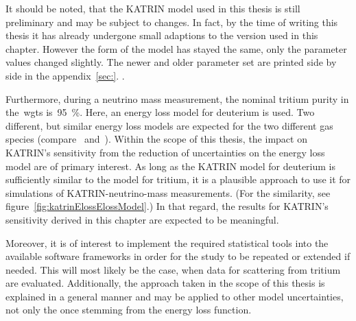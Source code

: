 It should be noted, that the KATRIN model used in this thesis is still preliminary and may be subject to changes. In fact, by the time of writing this thesis it has already undergone small adaptions to the version used in this chapter. However the form of the model has stayed the same, only the parameter values changed slightly. The newer and older parameter set are printed side by side in the appendix~\ref{sec:}. .

Furthermore, during a neutrino mass measurement, the nominal tritium purity in the~\gls{wgts} is~\SI{95}{\percent}. Here, an energy loss model for deuterium is used. Two different, but similar energy loss models are expected for the two different gas species (compare~\cite{Abdurashitov2017} and~\cite{Aseev2000}). Within the scope of this thesis, the impact on KATRIN's sensitivity from the reduction of uncertainties on the energy loss model are of primary interest. As long as the KATRIN model for deuterium is sufficiently similar to the model for tritium, it is a plausible approach to use it for simulations of KATRIN-neutrino-mass measurements. (For the similarity, see figure~\ref{fig:katrinElossElossModel}.) In that regard, the results for KATRIN's sensitivity derived in this chapter are expected to be meaningful.

Moreover, it is of interest to implement the required statistical tools into the available software frameworks in order for the study to be repeated or extended if needed. This will most likely be the case, when data for scattering from tritium are evaluated. Additionally, the approach taken in the scope of this thesis is explained in a general manner and may be applied to other model uncertainties, not only the once stemming from the energy loss function.

